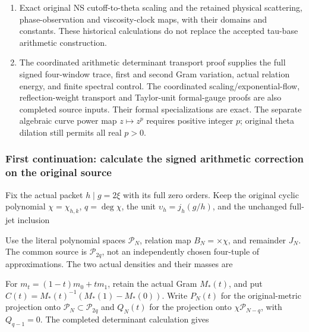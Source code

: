 \begin{enumerate}
  resonance, its kernel, all nilpotents and both Laplacian boundary
  terms. An off-weight source eigenvector satisfies the proved lower
  bound \(\|Bv\|/\|Rv\|\ge |\Re\lambda-k/2|\); quotient-boundary
  vanishing cannot delete that source vector.
\item
  Exact original NS cutoff-to-theta scaling and the retained physical
  scattering, phase-observation and viscosity-clock maps, with their
  domains and constants. These historical calculations do not replace
  the accepted tau-base arithmetic construction.
\item
  The coordinated arithmetic determinant transport proof supplies the
  full signed four-window trace, first and second Gram variation, actual
  relation energy, and finite spectral control. The coordinated
  scaling/exponential-flow, reflection-weight transport and Taylor-unit
  formal-gauge proofs are also completed source inputs. Their formal
  specializations are exact. The separate algebraic curve power map
  \(z\mapsto z^p\) requires positive integer \(p\); original theta
  dilation still permits all real \(p>0\).
\end{enumerate}

\subsubsection{First continuation: calculate the signed arithmetic
correction on the original
source}\label{first-continuation-calculate-the-signed-arithmetic-correction-on-the-original-source}

Fix the actual packet \(h\mid g=2\xi\) with its full zero orders. Keep
the original cyclic polynomial \(\chi=\chi_{h,k}\), \(q=\deg\chi\), the
unit \(\upsilon_h=j_h(g/h)\), and the unchanged full-jet inclusion


Use the literal polynomial spaces \(\mathcal P_N\), relation map
\(B_N=\times\chi\), and remainder \(J_N\). The common source is
\(\mathcal P_{2q}\), not an independently chosen four-tuple of
approximations. The two actual densities and their masses are

 

For \(m_t=(1-t)m_0+tm_1\), retain the actual Gram \(M_*(t)\), and put
\(C(t)=M_*(t)^{-1}(M_*(1)-M_*(0))\). Write \(P_N(t)\) for the
original-metric projection onto \(\mathcal P_N\subset\mathcal P_{2q}\)
and \(Q_N(t)\) for the projection onto \(\chi\mathcal P_{N-q}\), with
\(Q_{q-1}=0\). The completed determinant calculation gives

